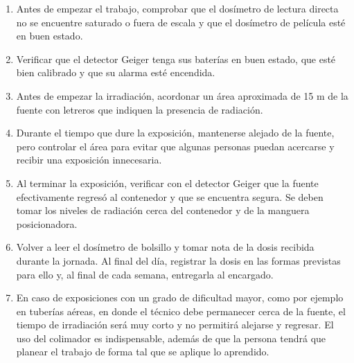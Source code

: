 \begin{enumerate}
  \item Antes de empezar el trabajo, comprobar que el dosímetro de lectura directa no se encuentre saturado o fuera de escala y que el dosímetro de película esté en buen estado.
  \item Verificar que el detector Geiger tenga sus baterías en buen estado, que esté bien calibrado y que su alarma esté encendida.
  \item Antes de empezar la irradiación, acordonar un área aproximada de 15 m de la fuente con letreros que indiquen la presencia de radiación.
  \item Durante el tiempo que dure la exposición, mantenerse alejado de la fuente, pero controlar el área para evitar que algunas personas puedan acercarse y recibir una exposición innecesaria.
  \item Al terminar la exposición, verificar con el detector Geiger que la fuente efectivamente regresó al contenedor y que se encuentra segura. Se deben tomar los niveles de radiación cerca del contenedor y de la manguera posicionadora.
  \item Volver a leer el dosímetro de bolsillo y tomar nota de la dosis recibida durante la jornada. Al final del día, registrar la dosis en las formas previstas para ello y, al final de cada semana, entregarla al encargado.
  \item En caso de exposiciones con un grado de dificultad mayor, como por ejemplo en tuberías aéreas, en donde el técnico debe permanecer cerca de la fuente, el tiempo de irradiación será muy corto y no permitirá alejarse y regresar. El uso del colimador es indispensable, además de que la persona tendrá que planear el trabajo de forma tal que se aplique lo aprendido.
\end{enumerate}
